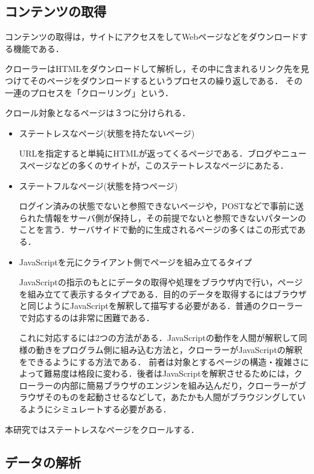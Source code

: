 \subsection{コンテンツの取得}
コンテンツの取得は，サイトにアクセスをしてWebページなどをダウンロードする機能である．

クローラーはHTMLをダウンロードして解析し，その中に含まれるリンク先を見つけてそのページをダウンロードするというプロセスの繰り返しである．
その一連のプロセスを「クローリング」という．


クロール対象となるページは３つに分けられる．

\begin{itemize}
  \item ステートレスなページ(状態を持たないページ)

URLを指定すると単純にHTMLが返ってくるページである．ブログやニュースページなどの多くのサイトが，このステートレスなページにあたる．
  \item ステートフルなページ(状態を持つページ)

ログイン済みの状態でないと参照できないページや，POSTなどで事前に送られた情報をサーバ側が保持し，その前提でないと参照できないパターンのことを言う．サーバサイドで動的に生成されるページの多くはこの形式である．
  \item JavaScriptを元にクライアント側でページを組み立てるタイプ

JavaScriptの指示のもとにデータの取得や処理をブラウザ内で行い，ページを組み立てて表示するタイプである．目的のデータを取得するにはブラウザと同じようにJavaScriptを解釈して描写する必要がある．普通のクローラーで対応するのは非常に困難である．

これに対応するには2つの方法がある．JavaScriptの動作を人間が解釈して同様の動きをプログラム側に組み込む方法と，クローラーがJavaScriptの解釈をできるようにする方法である．
前者は対象とするページの構造・複雑さによって難易度は格段に変わる．後者はJavaScriptを解釈させるためには，クローラーの内部に簡易ブラウザのエンジンを組み込んだり，クローラーがブラウザそのものを起動させるなどして，あたかも人間がブラウジングしているようにシミュレートする必要がある\cite{miyake}．


\end{itemize}


本研究ではステートレスなページをクロールする．


\subsection{データの解析}

